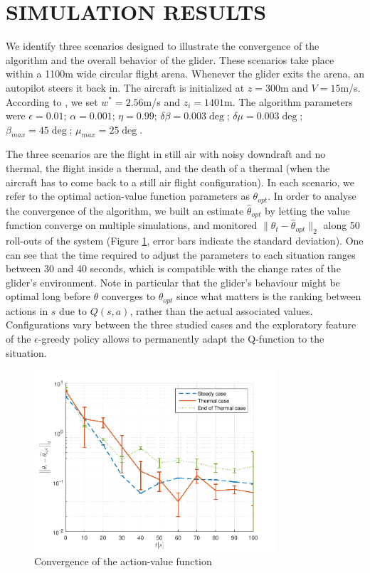 \documentclass[a4paper, 10pt, conference]{ieeeconf}
\begin{document}
\section{SIMULATION RESULTS}
\label{sec:results}

We identify three scenarios designed to illustrate the convergence of the algorithm and the overall behavior of the glider. These scenarios take place within a 1100m wide circular flight arena. Whenever the glider exits the arena, an autopilot steers it back in. The aircraft is initialized at $z=300$m and $V=15$m/s. According to \cite{allen_thermal}, we set $w^*=2.56$m/s and $z_i=1401$m. The algorithm parameters were $\epsilon = 0.01$; $\alpha = 0.001$; $\eta = 0.99$; $\delta \beta = 0.003\deg$; $\delta \mu = 0.003\deg$; $\beta_{max} = 45\deg$; $\mu_{max} = 25\deg$. 

The three scenarios are the flight in still air with noisy downdraft and no thermal, the flight inside a thermal, and the death of a thermal (when the aircraft has to come back to a still air flight configuration).
In each scenario, we refer to the optimal action-value function parameters as $\theta_{opt}$.
In order to analyse the convergence of the algorithm, we built an estimate $\widehat{\theta}_{opt}$ by letting the value function converge on multiple simulations, and monitored $\|\theta_t - \widehat{\theta}_{opt}\|_2$ along 50 roll-outs of the system (Figure \ref{fig:param_cv}, error bars indicate the standard deviation). One can see that the time required to adjust the parameters to each situation ranges between 30 and 40 seconds, which is compatible with the change rates of the glider's environment. Note in particular that the glider's behaviour might be optimal long before $\theta$ converges to $\theta_{opt}$ since what matters is the ranking between actions in $s$ due to $Q(s,a)$, rather than the actual associated values. Configurations vary between the three studied cases and the exploratory feature of the $\epsilon$-greedy policy allows to permanently adapt the Q-function to the situation.

\begin{figure}
\begin{center}
 \includegraphics[width=9cm]{img/cv_speed.pdf}
\end{center}
\caption{Convergence of the action-value function}
\label{fig:param_cv}
\end{figure}
\end{document}

